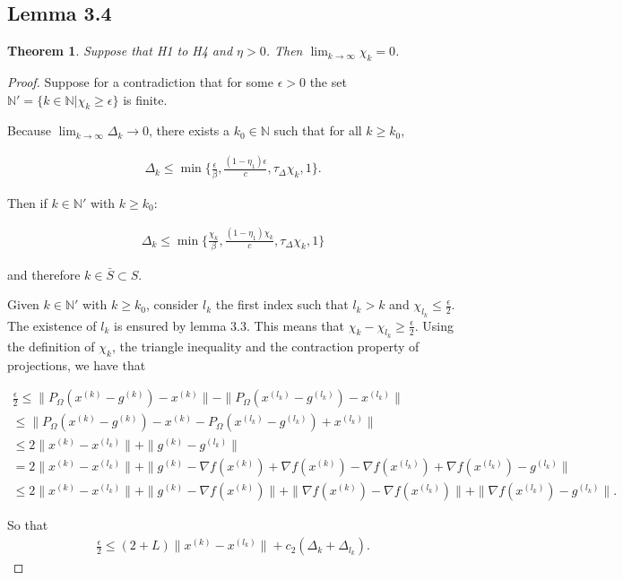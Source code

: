 \documentclass{article}
\newtheorem{theorem}{Theorem}
\newcommand{\grad}{\nabla f}
\newcommand{\xk}{{x}^{(k)}}
\newcommand{\ints}{\mathbb N}
\newcommand{\dk}{\Delta_k}
\newcommand{\pik}{\chi_k}
\newcommand{\gk}{{g^{(k)}}}
\newcommand{\oalpha}{\tau_{\Delta}}
\begin{document}
\subsection{Lemma 3.4}
\begin{theorem}
Suppose that H1 to H4 and $\eta > 0$. Then $\lim_{k\to\infty}\pik=0$.
\end{theorem}

\begin{proof}
Suppose for a contradiction that for some $\epsilon > 0$ the set $\ints ' = \{k \in \ints | \pik \ge \epsilon \}$
is finite.

Because $\lim_{k\to\infty}\Delta_k\to 0$, there exists a $k_0 \in \ints$ such that for all $k \ge k_0$,

\begin{align*}
\dk \le \min\{\frac{\epsilon}{\beta}, \frac{(1-\eta_1)\epsilon}{c}, \oalpha\pik, 1\}.
\end{align*}

Then if $k \in \ints '$ with $k \ge k_0$:

\begin{align*}
\dk \le \min\{\frac{\pik}{\beta}, \frac{(1-\eta_1)\pik}{c}, \oalpha\pik, 1\}
\end{align*}

and therefore $k \in \bar S \subset S$.

Given $k \in \ints'$ with $k\ge k_0$, consider $l_k$ the first index such that $l_k > k$ and $\chi_{l_k} \le \frac{\epsilon} 2$.
The existence of $l_k$ is ensured by lemma 3.3.
This means that $\pik - \chi_{l_k} \ge \frac {\epsilon} 2 $.
Using the definition of $\pik$, the triangle inequality and the contraction property of projections, we have that

\begin{align*}
\frac{\epsilon}{2} \le \|P_{\Omega}(\xk - \gk) - \xk\| - \|P_{\Omega}(x^{(l_k)} - g^{(l_k)}) - x^{(l_k)}\| \\
\le \|P_{\Omega}(\xk - \gk) - \xk - P_{\Omega}(x^{(l_k)} - g^{(l_k)}) + x^{(l_k)}\| \\
\le 2\|\xk - x^{(l_k)}\| + \|\gk - g^{(l_k)}\| \\
=   2\|\xk - x^{(l_k)}\| + \|\gk - \grad(\xk) + \grad(\xk) - \grad(x^{(l_k)}) + \grad(x^{(l_k)}) - g^{(l_k)}\| \\
\le 2\|\xk - x^{(l_k)}\| + \|\gk - \grad(\xk)\| + \|\grad(\xk) - \grad(x^{(l_k)})\| + \|\grad(x^{(l_k)}) - g^{(l_k)}\|.
\end{align*}

So that
\begin{align}
\frac{\epsilon} 2 \le (2 + L) \|\xk - x^{(l_k)}\| + c_2(\dk + \Delta_{l_k}).
\end{align}


\end{proof}
\end{document}
